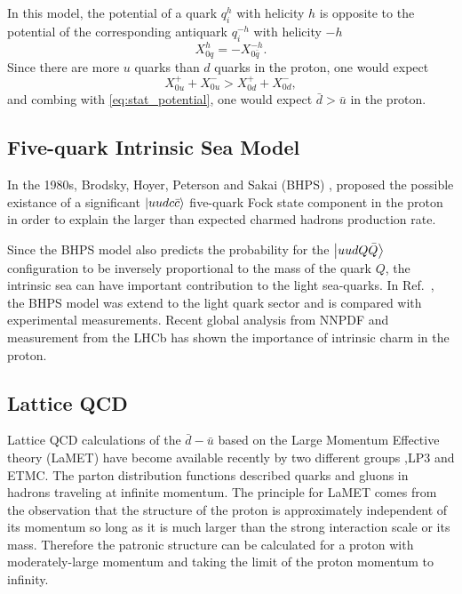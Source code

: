 \documentclass[../main.tex]{subfiles}
\begin{document}
In this model, the potential of a quark $q_i^h$ with helicity $h$ is opposite to the potential
of the corresponding antiquark $q_i^{-h}$ with helicity $-h$
\begin{equation}
	X_{0q}^h = -X_{0\bar{q}}^{-h}.
	\label{eq:stat_potential}
\end{equation}
Since there are more $u$ quarks than $d$ quarks in the proton, one would expect
\begin{equation}
	X_{0u}^+ + X_{0u}^- > X_{0d}^+ + X_{0d}^-,
\end{equation}
and combing with \cref{eq:stat_potential}, one would expect $\bar{d} > \bar{u}$ in the proton.

\subsection{Five-quark Intrinsic Sea Model}
In the 1980s, Brodsky, Hoyer, Peterson and Sakai (BHPS) \cite{brodsky1980}, proposed 
the possible existance of a significant $\ket{uudc\bar{c}}$ five-quark Fock state component
in the proton in order to explain the larger than expected charmed hadrons production rate.


Since the BHPS model also predicts the probability for the $\ket{uudQ\bar{Q}}$ configuration to
be inversely proportional to the mass of the quark $Q$, the intrinsic sea can have important
contribution to the light sea-quarks. In Ref.~\cite{chang2011,chang2011a}, the BHPS model 
was extend to the light quark sector and is compared with experimental measurements.
Recent global analysis from NNPDF \cite{ball2022} and measurement from the LHCb \cite{aaij2022} 
has shown the importance of intrinsic charm in the proton.



\subsection{Lattice QCD}
Lattice QCD calculations of the $\bar{d} - \bar{u}$ based on the Large Momentum Effective
theory (LaMET) \cite{ji2021,constantinou2021} have become available recently by two different groups ,LP3\cite{chen2018} and ETMC\cite{alexandrou2018}. 
The parton distribution functions described quarks and gluons in hadrons traveling at infinite
momentum. The principle for LaMET comes from the observation that the structure of the proton is
approximately independent of its momentum so long as it is much larger than the strong interaction
scale or its mass. Therefore the patronic structure can be calculated for a proton with
moderately-large momentum and taking the limit of the proton momentum to infinity.
\end{document}
